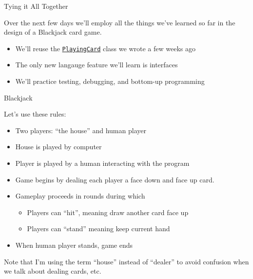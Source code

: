 \documentclass{beamer}
\author[Chris Simpkins] 
{Christopher Simpkins \\\texttt{chris.simpkins@gatech.edu}}
\institute[Georgia Tech] %
\date[CS 1331]{}
\newcommand{\code}{http://www.cc.gatech.edu/~simpkins/teaching/gatech/cs1331/code}
\begin{document}
\begin{frame}
  \titlepage
\end{frame}



\begin{frame}[fragile]{Tying it All Together}



Over the next few days we'll employ all the things we've learned so far in the design of a Blackjack card game.
\begin{itemize}
\item We'll reuse the \href{\code/PlayingCard.java}{{\tt PlayingCard}} class we wrote a few weeks ago
\item The only new langauge feature we'll learn is interfaces
\item We'll practice testing, debugging, and bottom-up programming
\end{itemize}


\end{frame}

\begin{frame}[fragile]{Blackjack}


Let's use these rules:
\begin{itemize}
\item Two players: ``the house'' and human player
\item House is played by computer
\item Player is played by a human interacting with the program
\item Game begins by dealing each player a face down and face up card.
\item Gameplay proceeds in rounds during which
\begin{itemize}
\item Players can ``hit'', meaning draw another card face up
\item Players can ``stand'' meaning keep current hand
\end{itemize}
\item When human player stands, game ends
\end{itemize}
Note that I'm using the term ``house'' instead of ``dealer'' to avoid confusion when we talk about dealing cards, etc.
\end{frame}
\end{document}

